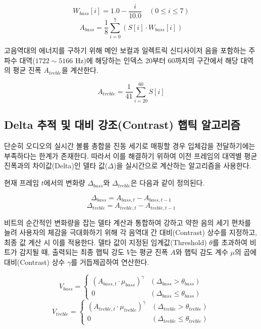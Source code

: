 \documentclass{kcc}
\begin{document}
\begin{equation}
W_{bass}[i] = 1.0 - \frac{i}{10.0} \quad (0 \le i \le 7)
\end{equation}
\begin{equation}
A_{bass} = \frac{1}{8} \sum_{i=0}^{7} (S[i] \cdot W_{bass}[i])
\end{equation}

고음역대의 에너지를 구하기 위해 메인 보컬과 일렉트릭 신디사이저 음을 포함하는 주파수 대역($1722 \sim 5166\text{ Hz}$)에 해당하는 인덱스 20부터 60까지의 구간에서 해당 대역의 평균 진폭 $A_{treble}$을 계산한다.

\begin{equation}
A_{treble} = \frac{1}{41} \sum_{i=20}^{60} S[i]
\end{equation}

\subsection{Delta 추적 및 대비 강조(Contrast) 햅틱 알고리즘}
단순히 오디오의 실시간 볼륨 총합을 진동 세기로 매핑할 경우 입체감을 전달하기에는 부족하다는 한계가 존재한다. 따라서 이를 해결하기 위하여 이전 프레임의 대역별 평균 진폭과의 차이값(Delta)인 델타 값($\Delta$)을 실시간으로 계산하는 알고리즘을 사용한다.

현재 프레임 $t$에서의 변화량 $\Delta_{bass}$와 $\Delta_{treble}$은 다음과 같이 정의된다.

\begin{equation}
\Delta_{bass} = A_{bass, t} - A_{bass, t-1}
\end{equation}
\begin{equation}
\Delta_{treble} = A_{treble, t} - A_{treble, t-1}
\end{equation}

비트의 순간적인 변화량을 잡는 델타 계산과 통합하여 강하고 약한 음의 세기 편차를 늘려 사용자의 체감을 극대화하기 위해 각 음역대 간 대비(Contrast) 상수를 지정하고, 최종 값 계산 시 이를 적용한다. 델타 값이 지정된 임계값(Threshold) $\theta$를 초과하여 비트가 감지될 때, 출력되는 최종 햅틱 강도 $V$는 평균 진폭 $A$와 햅틱 감도 계수 $\mu$의 곱에 대비(Contrast) 상수 $\gamma$를 거듭제곱하여 연산한다.

\begin{equation}
V_{bass} = \begin{cases} (A_{bass, t} \cdot \mu_{bass})^\gamma & (\Delta_{bass} > \theta_{bass}) \\ 0 & (\Delta_{bass} \le \theta_{bass}) \end{cases}
\end{equation}
\begin{equation}
V_{treble} = \begin{cases} (A_{treble, t} \cdot \mu_{treble})^\gamma & (\Delta_{treble} > \theta_{treble}) \\ 0 & (\Delta_{treble} \le \theta_{treble}) \end{cases}
\end{equation}
\end{document}
